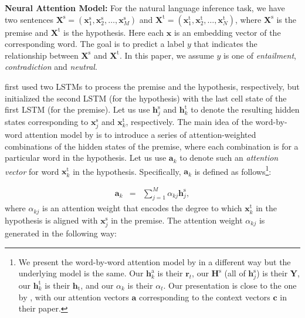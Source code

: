 \documentclass[11pt,letterpaper]{article}
\begin{document}
\noindent \textbf{Neural Attention Model:} For the natural language inference task, we have two sentences $\mathbf{X}^\text{s} = (\mathbf{x}^\text{s}_1, \mathbf{x}^\text{s}_2, \ldots, \mathbf{x}^\text{s}_M)$ and $\mathbf{X}^\text{t} = (\mathbf{x}^\text{t}_1, \mathbf{x}^\text{t}_2, \ldots, \mathbf{x}^\text{t}_N)$, where $\mathbf{X}^\text{s}$ is the premise and $\mathbf{X}^\text{t}$ is the hypothesis.
Here each $\mathbf{x}$ is an embedding vector of the corresponding word.
The goal is to predict a label $y$ that indicates the relationship between $\mathbf{X}^\text{s}$ and $\mathbf{X}^\text{t}$.
In this paper, we assume $y$ is one of \emph{entailment}, \emph{contradiction} and \emph{neutral}.

 first used two LSTMs to process the premise and the hypothesis, respectively, but initialized the second LSTM (for the hypothesis) with the last cell state of the first LSTM (for the premise).
Let us use $\mathbf{h}^\text{s}_j$ and $\mathbf{h}^\text{t}_k$ to denote the resulting hidden states corresponding to $\mathbf{x}^\text{s}_j$ and $\mathbf{x}^\text{t}_k$, respectively.
The main idea of the word-by-word attention model by  is to introduce a series of attention-weighted combinations of the hidden states of the premise, where each combination is for a particular word in the hypothesis.
Let us use $\mathbf{a}_k$ to denote such an \emph{attention vector} for word $\mathbf{x}^\text{t}_k$ in the hypothesis.
Specifically, $\mathbf{a}_k$ is defined as follows\footnote{We present the word-by-word attention model by  in a different way but the underlying model is the same. 
Our $\mathbf{h}^\text{a}_k$ is their $\mathbf{r}_t$,  our $\mathbf{H}^\text{s}$ (all of $\mathbf{h}^\text{s}_j$) is their $\mathbf{Y}$, our $\mathbf{h}^\text{t}_k$ is their $\mathbf{h}_\text{t}$, and our $\alpha_k$ is their $\alpha_t$.
Our presentation is close to the one by , with our attention vectors $\mathbf{a}$ corresponding to the context vectors $\mathbf{c}$ in their paper. }:

\small
\begin{eqnarray}
\label{eqn:a_k}
\mathbf{a}_k & = & \sum_{j=1}^M \alpha_{kj} \mathbf{h}^\text{s}_j,
\end{eqnarray}
\normalsize
where $\alpha_{kj}$ is an attention weight that encodes the degree to which $\mathbf{x}^\text{t}_k$ in the hypothesis is aligned with $\mathbf{x}^\text{s}_j$ in the premise.
The attention weight $\alpha_{kj}$ is generated in the following way:
\end{document}
